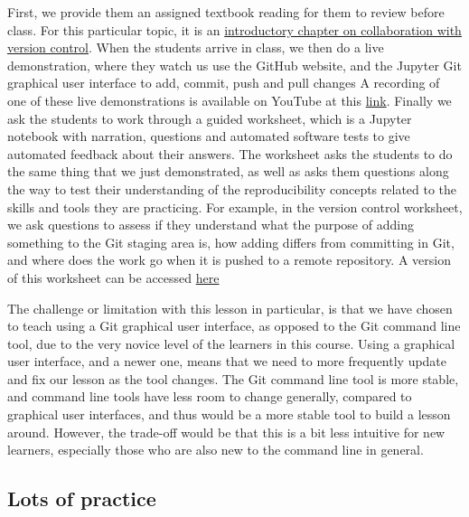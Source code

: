 \documentclass{article}
\begin{document}
First, we provide them an assigned textbook reading for them to review
before class. For this particular topic, it is an
\href{https://ubc-dsci.github.io/introduction-to-datascience/Getting-started-with-version-control.html}{introductory
chapter on collaboration with version control}. When the students arrive
in class, we then do a live demonstration, where they watch us use the
GitHub website, and the Jupyter Git graphical user interface to add,
commit, push and pull changes A recording of one of these live
demonstrations is available on YouTube at this
\href{https://youtu.be/attPo4zEElU}{link}. Finally we ask the students
to work through a guided worksheet, which is a Jupyter notebook with
narration, questions and automated software tests to give automated
feedback about their answers. The worksheet asks the students to do the
same thing that we just demonstrated, as well as asks them questions
along the way to test their understanding of the reproducibility
concepts related to the skills and tools they are practicing. For
example, in the version control worksheet, we ask questions to assess if
they understand what the purpose of adding something to the Git staging
area is, how adding differs from committing in Git, and where does the
work go when it is pushed to a remote repository. A version of this
worksheet can be accessed
\href{https://github.com/UBC-DSCI/dsci-100-assets/blob/master/2021-summer/materials/worksheet_05/worksheet_05.ipynb}{here}

The challenge or limitation with this lesson in particular, is that we
have chosen to teach using a Git graphical user interface, as opposed to
the Git command line tool, due to the very novice level of the learners
in this course. Using a graphical user interface, and a newer one, means
that we need to more frequently update and fix our lesson as the tool
changes. The Git command line tool is more stable, and command line
tools have less room to change generally, compared to graphical user
interfaces, and thus would be a more stable tool to build a lesson
around. However, the trade-off would be that this is a bit less
intuitive for new learners, especially those who are also new to the
command line in general.

\hypertarget{lots-of-practice}{%
\subsection{Lots of practice}\label{lots-of-practice}}
\end{document}
